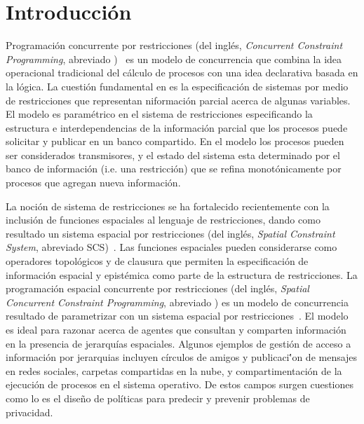 
\chapter{Introducci\'on}
\label{cha.intro}

Programaci\'on concurrente por restricciones (del ingl\'es, \textit{Concurrent Constraint Programming}, abreviado \CCP)~\cite{DBLP:conf/popl/SaraswatR90,semantic-ccp,cp-book} es un modelo de concurrencia que combina la idea operacional tradicional del c\'alculo de procesos con una idea declarativa basada en la l\'ogica. La cuesti\'on fundamental en \CCP es la especificaci\'on de sistemas por medio de restricciones que representan niformaci\'on parcial acerca de algunas variables. El modelo \CCP es param\'etrico en el sistema de restricciones especificando la estructura e interdependencias de la informaci\'on parcial que los procesos puede solicitar y publicar en un banco compartido. En el modelo  \CCP los procesos pueden ser considerados transmisores, y el estado del sistema esta determinado por el banco de informaci\'on (i.e. una restricci\'on) que se refina monot\'onicamente por procesos que agregan nueva informaci\'on.

La noci\'on de sistema de restricciones se ha fortalecido recientemente con la inclusi\'on de funciones espaciales al lenguaje de restricciones, dando como resultado un sistema espacial por restricciones (del ingl\'es, \textit{Spatial Constraint System}, abreviado SCS)~\cite{knight:hal-00761116}. Las funciones espaciales pueden considerarse como operadores topol\'ogicos y de clausura que permiten la especificaci\'on de informaci\'on espacial y epist\'emica como parte de la estructura de restricciones. La programaci\'on espacial concurrente por restricciones (del ingl\'es, \textit{Spatial Concurrent Constraint Programming}, abreviado \SCCP) es un modelo de concurrencia resultado de parametrizar \CCP con un sistema espacial por restricciones~\cite{knight:hal-00761116}. El modelo \SCCP es ideal para razonar acerca de agentes que consultan y comparten informaci\'on en la presencia de jerarqu\'ias espaciales. Algunos ejemplos de gesti\'on de acceso a informaci\'on por jerarquias incluyen c\'irculos de amigos y publicaci\''on de mensajes en redes sociales, carpetas compartidas en la nube, y compartimentaci\'on de la ejecuci\'on de procesos en el sistema operativo. De estos campos surgen cuestiones como lo es el dise\~no de pol\'iticas para predecir y prevenir problemas de privacidad.

